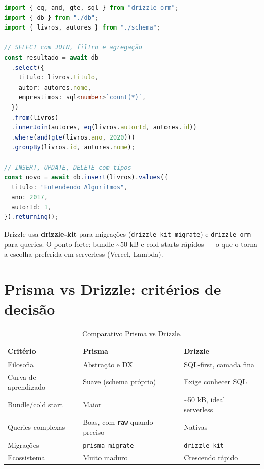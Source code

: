 \begin{lstlisting}[style=livro, language=TypeScript,
  caption={Query Drizzle próxima do SQL.}, label={list:drizzle-query}]
import { eq, and, gte, sql } from "drizzle-orm";
import { db } from "./db";
import { livros, autores } from "./schema";

// SELECT com JOIN, filtro e agregação
const resultado = await db
  .select({
    titulo: livros.titulo,
    autor: autores.nome,
    emprestimos: sql<number>`count(*)`,
  })
  .from(livros)
  .innerJoin(autores, eq(livros.autorId, autores.id))
  .where(and(gte(livros.ano, 2020)))
  .groupBy(livros.id, autores.nome);

// INSERT, UPDATE, DELETE com tipos
const novo = await db.insert(livros).values({
  titulo: "Entendendo Algoritmos",
  ano: 2017,
  autorId: 1,
}).returning();
\end{lstlisting}

\begin{caixadica}
Drizzle usa \textbf{drizzle-kit} para migrações (\texttt{drizzle-kit migrate})
e \texttt{drizzle-orm} para queries. O ponto forte: bundle \textasciitilde{}50
kB e cold starts rápidos — o que o torna a escolha preferida em serverless
(Vercel, Lambda).
\end{caixadica}

\section{Prisma vs Drizzle: critérios de decisão}

\begin{table}[h]
\centering
\small
\caption{Comparativo Prisma vs Drizzle.}
\label{tab:prisma-drizzle}
\begin{tabularx}{\textwidth}{@{}l X X@{}}
\toprule
\textbf{Critério} & \textbf{Prisma} & \textbf{Drizzle} \\
\midrule
Filosofia & Abstração e DX & SQL-first, camada fina \\
Curva de aprendizado & Suave (schema próprio) & Exige conhecer SQL \\
Bundle/cold start & Maior & \textasciitilde{}50 kB, ideal serverless \\
Queries complexas & Boas, com \texttt{raw} quando preciso & Nativas \\
Migrações & \texttt{prisma migrate} & \texttt{drizzle-kit} \\
Ecossistema & Muito maduro & Crescendo rápido \\
\bottomrule
\end{tabularx}
\end{table}

